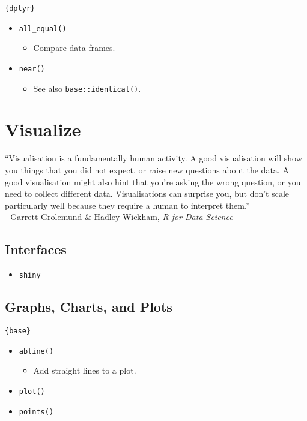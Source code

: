 \documentclass[
]{book}
\providecommand{\tightlist}{%
  \setlength{\itemsep}{0pt}\setlength{\parskip}{0pt}}
\begin{document}
\texttt{\{dplyr\}}

\begin{itemize}
\tightlist
\item
  \texttt{all\_equal()}

  \begin{itemize}
  \tightlist
  \item
    Compare data frames.
  \end{itemize}
\item
  \texttt{near()}

  \begin{itemize}
  \tightlist
  \item
    See also \texttt{base::identical()}.
  \end{itemize}
\end{itemize}

\hypertarget{visualize}{%
\chapter{Visualize}\label{visualize}}

``Visualisation is a fundamentally human activity. A good visualisation will show you things that you did not expect, or raise new questions about the data. A good visualisation might also hint that you're asking the wrong question, or you need to collect different data. Visualisations can surprise you, but don't scale particularly well because they require a human to interpret them.''\\
- Garrett Grolemund \& Hadley Wickham, \emph{R for Data Science}

\hypertarget{interfaces}{%
\section{Interfaces}\label{interfaces}}

\begin{itemize}
\tightlist
\item
  \texttt{shiny}
\end{itemize}

\hypertarget{graphs-charts-and-plots}{%
\section{Graphs, Charts, and Plots}\label{graphs-charts-and-plots}}

\texttt{\{base\}}

\begin{itemize}
\tightlist
\item
  \texttt{abline()}

  \begin{itemize}
  \tightlist
  \item
    Add straight lines to a plot.
  \end{itemize}
\item
  \texttt{plot()}
\item
  \texttt{points()}
\end{itemize}
\end{document}
